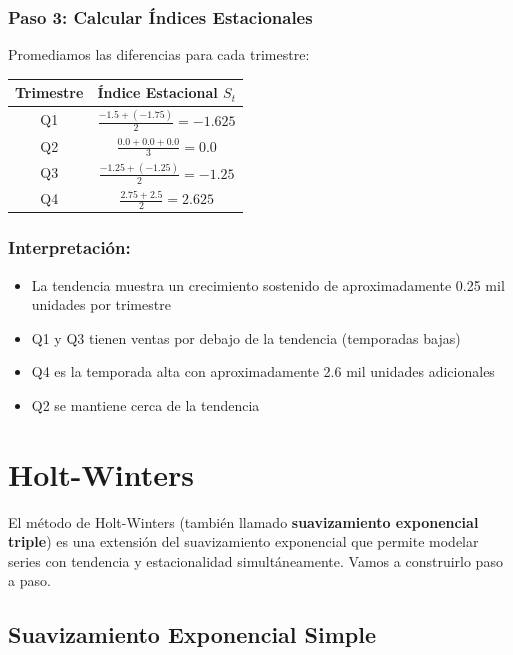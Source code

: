 \documentclass[12pt]{article}
\begin{document}
\subsubsection{Paso 3: Calcular Índices Estacionales}

Promediamos las diferencias para cada trimestre:

\begin{center}
\begin{tabular}{|c|c|}
\hline
\textbf{Trimestre} & \textbf{Índice Estacional $S_t$} \\
\hline
Q1 & $\frac{-1.5 + (-1.75)}{2} = -1.625$ \\
Q2 & $\frac{0.0 + 0.0 + 0.0}{3} = 0.0$ \\
Q3 & $\frac{-1.25 + (-1.25)}{2} = -1.25$ \\
Q4 & $\frac{2.75 + 2.5}{2} = 2.625$ \\
\hline
\end{tabular}
\end{center}

\subsubsection{Interpretación:}
\begin{itemize}
    \item La tendencia muestra un crecimiento sostenido de aproximadamente 0.25 mil unidades por trimestre
    \item Q1 y Q3 tienen ventas por debajo de la tendencia (temporadas bajas)
    \item Q4 es la temporada alta con aproximadamente 2.6 mil unidades adicionales
    \item Q2 se mantiene cerca de la tendencia
\end{itemize}

\section{Holt-Winters}

El método de Holt-Winters (también llamado \textbf{suavizamiento exponencial triple}) es una extensión del suavizamiento exponencial que permite modelar series con tendencia y estacionalidad simultáneamente. Vamos a construirlo paso a paso.

\subsection{Suavizamiento Exponencial Simple}
\end{document}
